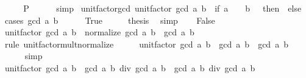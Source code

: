\begin{isabellebody}
\ \ \isamarkupfalse%
\ \isamarkupfalse%
\ {\isacharquery}{\kern0pt}P\isanewline
\ \ \ \ \isamarkupfalse%
\ simp\isanewline
{}\isamarkupfalse%
%
\endisatagproof
{\isafoldproof}%
%
\isadelimproof
\isanewline
%
\endisadelimproof
\isanewline
{}\isamarkupfalse%
\ unit{\isacharunderscore}{\kern0pt}factor{\isacharunderscore}{\kern0pt}gcd{\isacharcolon}{\kern0pt}\ {\isachardoublequoteopen}unit{\isacharunderscore}{\kern0pt}factor\ {\isacharparenleft}{\kern0pt}gcd\ a\ b{\isacharparenright}{\kern0pt}\ {\isacharequal}{\kern0pt}\ {\isacharparenleft}{\kern0pt}if\ a\ {\isacharequal}{\kern0pt}\ {}\ {\isasymand}\ b\ {\isacharequal}{\kern0pt}\ {}\ then\ {}\ else\ {}{\isacharparenright}{\kern0pt}{\isachardoublequoteclose}\isanewline
%
\isadelimproof
%
\endisadelimproof
%
\isatagproof
{}\isamarkupfalse%
\ {\isacharparenleft}{\kern0pt}cases\ {\isachardoublequoteopen}gcd\ a\ b\ {\isacharequal}{\kern0pt}\ {}{\isachardoublequoteclose}{\isacharparenright}{\kern0pt}\isanewline
\ \ \isamarkupfalse%
\ True\isanewline
\ \ \isamarkupfalse%
\ \isamarkupfalse%
\ {\isacharquery}{\kern0pt}thesis\ \isamarkupfalse%
\ simp\isanewline
{}\isamarkupfalse%
\isanewline
\ \ \isamarkupfalse%
\ False\isanewline
\ \ \isamarkupfalse%
\ {\isachardoublequoteopen}unit{\isacharunderscore}{\kern0pt}factor\ {\isacharparenleft}{\kern0pt}gcd\ a\ b{\isacharparenright}{\kern0pt}\ {\isacharasterisk}{\kern0pt}\ normalize\ {\isacharparenleft}{\kern0pt}gcd\ a\ b{\isacharparenright}{\kern0pt}\ {\isacharequal}{\kern0pt}\ gcd\ a\ b{\isachardoublequoteclose}\isanewline
\ \ \ \ \isamarkupfalse%
\ {\isacharparenleft}{\kern0pt}rule\ unit{\isacharunderscore}{\kern0pt}factor{\isacharunderscore}{\kern0pt}mult{\isacharunderscore}{\kern0pt}normalize{\isacharparenright}{\kern0pt}\isanewline
\ \ \isamarkupfalse%
\ \isamarkupfalse%
\ {\isachardoublequoteopen}unit{\isacharunderscore}{\kern0pt}factor\ {\isacharparenleft}{\kern0pt}gcd\ a\ b{\isacharparenright}{\kern0pt}\ {\isacharasterisk}{\kern0pt}\ gcd\ a\ b\ {\isacharequal}{\kern0pt}\ gcd\ a\ b{\isachardoublequoteclose}\isanewline
\ \ \ \ \isamarkupfalse%
\ simp\isanewline
\ \ \isamarkupfalse%
\ \isamarkupfalse%
\ {\isachardoublequoteopen}unit{\isacharunderscore}{\kern0pt}factor\ {\isacharparenleft}{\kern0pt}gcd\ a\ b{\isacharparenright}{\kern0pt}\ {\isacharasterisk}{\kern0pt}\ gcd\ a\ b\ div\ gcd\ a\ b\ {\isacharequal}{\kern0pt}\ gcd\ a\ b\ div\ gcd\ a\ b{\isachardoublequoteclose}\isanewline

\end{isabellebody}
